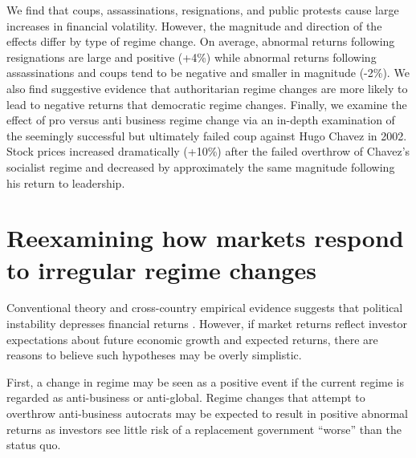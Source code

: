 \documentclass[12pt,final,fleqn]{article}
\theoremstyle{plain}
\begin{document}
We find that coups, assassinations, resignations, and public protests cause large increases in financial volatility. However, the magnitude and direction of the effects differ by type of regime change. On average, abnormal returns following resignations are large and positive (+4\%) while abnormal returns following assassinations and coups tend to be negative and smaller in magnitude (-2\%). We also find suggestive evidence that authoritarian regime changes are more likely to lead to negative returns that democratic regime changes. Finally, we examine the effect of pro versus anti business regime change via an in-depth examination of the seemingly successful but ultimately failed coup against Hugo Chavez in 2002. Stock prices increased dramatically (+10\%) after the failed overthrow of Chavez's socialist regime and decreased by approximately the same magnitude following his return to leadership.

\singlespacing
\section{Reexamining how markets respond to irregular regime changes}
\doublespacing

Conventional theory and cross-country empirical evidence suggests that political instability depresses financial returns \citep{irshad2017relationship, le2006political, lensink2000capital, boutchkova2012precarious, lehkonen2015democracy}. However, if market returns reflect investor expectations about future economic growth and expected returns, there are reasons to believe such hypotheses may be overly simplistic. 

First, a change in regime may be seen as a positive event if the current regime is regarded as anti-business or anti-global. Regime changes that attempt to overthrow anti-business autocrats may be expected to result in positive abnormal returns as investors see little risk of a replacement government ``worse'' than the status quo.
\end{document}
